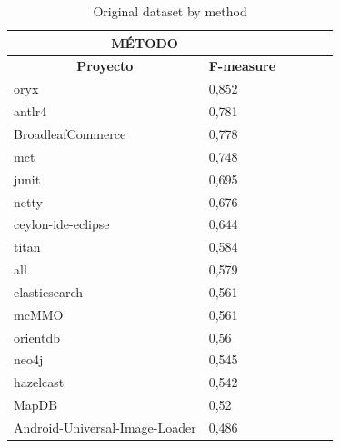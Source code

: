 \begin{table}[H]
\caption{\label{table:original_weka_method} Original dataset by method}
\begin{tabular}{llllll}
\hline
\multicolumn{2}{c}{\textbf{MÉTODO}} 
\\
\hline
\multicolumn{1}{c}{\textbf{Proyecto}} & \multicolumn{1}{c}{\textbf{F-measure}} \\
\hline
oryx                                 & 0,852                                  \\
antlr4                               & 0,781                                  \\
BroadleafCommerce                    & 0,778                                  \\
mct                                  & 0,748                                  \\
junit                                & 0,695                                  \\
netty                                & 0,676                                  \\
ceylon-ide-eclipse                   & 0,644                                  \\
titan                                & 0,584                                  \\
all                                  & 0,579                                  \\
elasticsearch                        & 0,561                                  \\
mcMMO                                & 0,561                                  \\
orientdb                             & 0,56                                   \\
neo4j                                & 0,545                                  \\
hazelcast                            & 0,542                                  \\
MapDB                                & 0,52                                   \\
Android-Universal-Image-Loader       & 0,486                                 
\end{tabular}
\end{table}